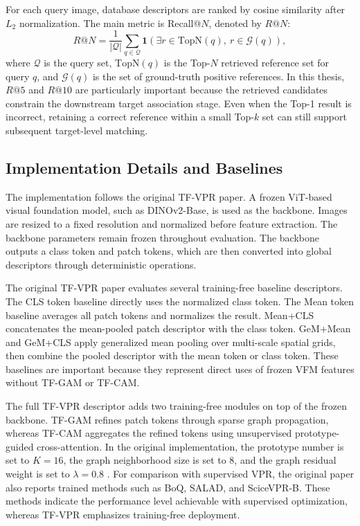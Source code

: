For each query image, database descriptors are ranked by cosine similarity after \(L_2\) normalization. The main metric is Recall@\(N\), denoted by \(R@N\):
\begin{equation}
  R@N = \frac{1}{|\mathcal{Q}|}\sum_{q \in \mathcal{Q}} \mathbf{1}
  \left( \exists r \in \mathrm{TopN}(q),\ r \in \mathcal{G}(q) \right),
\end{equation}
where \(\mathcal{Q}\) is the query set, \(\mathrm{TopN}(q)\) is the Top-\(N\) retrieved reference set for query \(q\), and \(\mathcal{G}(q)\) is the set of ground-truth positive references. In this thesis, \(R@5\) and \(R@10\) are particularly important because the retrieved candidates constrain the downstream target association stage. Even when the Top-1 result is incorrect, retaining a correct reference within a small Top-\(k\) set can still support subsequent target-level matching.

\subsection{Implementation Details and Baselines}
The implementation follows the original TF-VPR paper. A frozen ViT-based visual foundation model, such as DINOv2-Base, is used as the backbone. Images are resized to a fixed resolution and normalized before feature extraction. The backbone parameters remain frozen throughout evaluation. The backbone outputs a class token and patch tokens, which are then converted into global descriptors through deterministic operations.

The original TF-VPR paper evaluates several training-free baseline descriptors. The CLS token baseline directly uses the normalized class token. The Mean token baseline averages all patch tokens and normalizes the result. Mean+CLS concatenates the mean-pooled patch descriptor with the class token. GeM+Mean and GeM+CLS apply generalized mean pooling over multi-scale spatial grids, then combine the pooled descriptor with the mean token or class token. These baselines are important because they represent direct uses of frozen VFM features without TF-GAM or TF-CAM.

The full TF-VPR descriptor adds two training-free modules on top of the frozen backbone. TF-GAM refines patch tokens through sparse graph propagation, whereas TF-CAM aggregates the refined tokens using unsupervised prototype-guided cross-attention. In the original implementation, the prototype number is set to \(K=16\), the graph neighborhood size is set to 8, and the graph residual weight is set to \(\lambda=0.8\) \cite{wang2026tfvpr}. For comparison with supervised VPR, the original paper also reports trained methods such as BoQ, SALAD, and SciceVPR-B. These methods indicate the performance level achievable with supervised optimization, whereas TF-VPR emphasizes training-free deployment.

